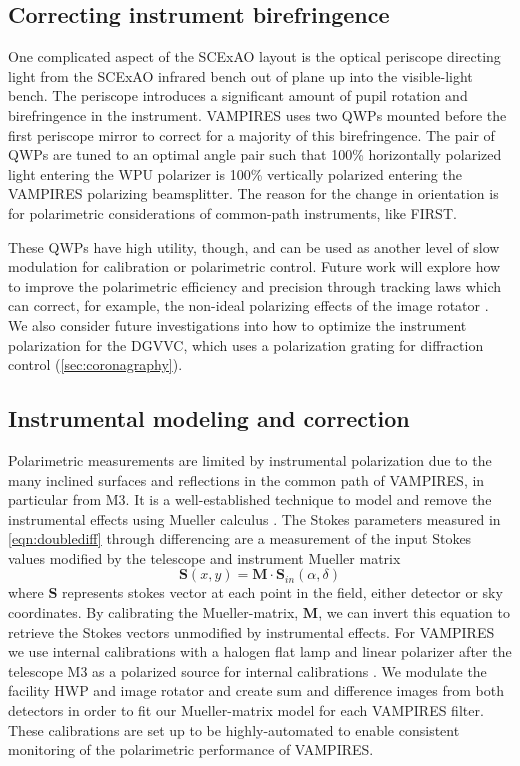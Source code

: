 \subsection{Correcting instrument birefringence}

One complicated aspect of the SCExAO layout is the optical periscope directing light from the SCExAO infrared bench out of plane up into the visible-light bench.  The periscope introduces a significant amount of pupil rotation and birefringence in the instrument. VAMPIRES uses two QWPs mounted before the first periscope mirror to correct for a majority of this birefringence. The pair of QWPs are tuned to an optimal angle pair such that 100\% horizontally polarized light entering the WPU polarizer is 100\% vertically polarized entering the VAMPIRES polarizing beamsplitter. The reason for the change in orientation is for polarimetric considerations of common-path instruments, like FIRST.

These QWPs have high utility, though, and can be used as another level of slow modulation for calibration or polarimetric control. Future work will explore how to improve the polarimetric efficiency and precision through tracking laws which can correct, for example, the non-ideal polarizing effects of the image rotator \citep{joost_t_hart_full_2021,zhang_characterizing_2023}. We also consider future investigations into how to optimize the instrument polarization for the DGVVC, which uses a polarization grating for diffraction control (\autoref{sec:coronagraphy}).

\subsection{Instrumental modeling and correction}

Polarimetric measurements are limited by instrumental polarization due to the many inclined surfaces and reflections in the common path of VAMPIRES, in particular from M3. It is a well-established technique to model and remove the instrumental effects using Mueller calculus \citep{holstein_polarimetric_2020,joost_t_hart_full_2021}. The Stokes parameters measured in \autoref{eqn:doublediff} through differencing are a measurement of the input Stokes values modified by the telescope and instrument Mueller matrix
\begin{equation}
    \mathbf{S}(x, y) = \mathbf{M}\cdot\mathbf{S}_{in}(\alpha, \delta)
\end{equation}
where $\mathbf{S}$ represents stokes vector at each point in the field, either detector or sky coordinates. By calibrating the Mueller-matrix, $\mathbf{M}$, we can invert this equation to retrieve the Stokes vectors unmodified by instrumental effects. For VAMPIRES we use internal calibrations with a halogen flat lamp and linear polarizer after the telescope M3 as a polarized source for internal calibrations \citep{zhang_characterizing_2023}. We modulate the facility HWP and image rotator and create sum and difference images from both detectors in order to fit our Mueller-matrix model for each VAMPIRES filter. These calibrations are set up to be highly-automated to enable consistent monitoring of the polarimetric performance of VAMPIRES.

